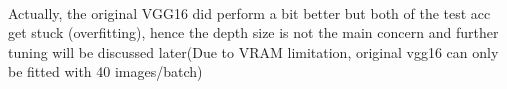 \documentclass[11pt, a4paper]{article} %
\begin{document}
\\ Actually, the original VGG16 did perform a bit better but both of the test acc get stuck (overfitting), hence the depth size is not the main concern and further tuning will be discussed later(Due to VRAM limitation, original vgg16 can only be fitted with 40 images/batch)
\begin{figure}[H]
  \centering

\end{figure}
\end{document}
